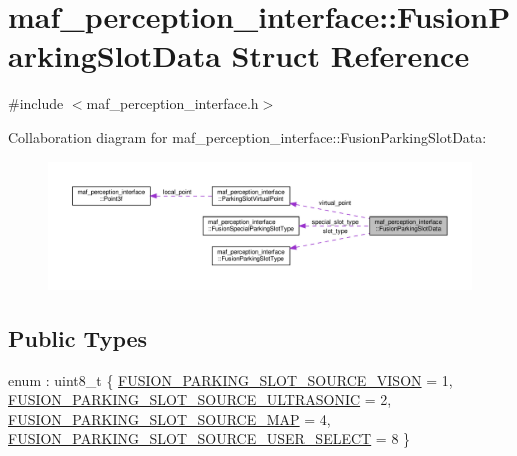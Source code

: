 \hypertarget{structmaf__perception__interface_1_1FusionParkingSlotData}{}\section{maf\+\_\+perception\+\_\+interface\+:\+:Fusion\+Parking\+Slot\+Data Struct Reference}
\label{structmaf__perception__interface_1_1FusionParkingSlotData}


{\ttfamily \#include $<$maf\+\_\+perception\+\_\+interface.\+h$>$}



Collaboration diagram for maf\+\_\+perception\+\_\+interface\+:\+:Fusion\+Parking\+Slot\+Data\+:\nopagebreak
\begin{figure}[H]
\begin{center}
\leavevmode
\includegraphics[width=350pt]{structmaf__perception__interface_1_1FusionParkingSlotData__coll__graph}
\end{center}
\end{figure}
\subsection*{Public Types}
\begin{DoxyCompactItemize}
\item 
enum \+: uint8\+\_\+t \{ \hyperlink{structmaf__perception__interface_1_1FusionParkingSlotData_a31f26bc8eda5baf9ea9398db41a7f304ab13b5a160f0258968905fd159f14f3cd}{F\+U\+S\+I\+O\+N\+\_\+\+P\+A\+R\+K\+I\+N\+G\+\_\+\+S\+L\+O\+T\+\_\+\+S\+O\+U\+R\+C\+E\+\_\+\+V\+I\+S\+ON} = 1, 
\hyperlink{structmaf__perception__interface_1_1FusionParkingSlotData_a31f26bc8eda5baf9ea9398db41a7f304a51fe14fc7e7e142e8147a02eeceaf8b6}{F\+U\+S\+I\+O\+N\+\_\+\+P\+A\+R\+K\+I\+N\+G\+\_\+\+S\+L\+O\+T\+\_\+\+S\+O\+U\+R\+C\+E\+\_\+\+U\+L\+T\+R\+A\+S\+O\+N\+IC} = 2, 
\hyperlink{structmaf__perception__interface_1_1FusionParkingSlotData_a31f26bc8eda5baf9ea9398db41a7f304a6a7bb3902bc0268e1199ce40e0bf4f10}{F\+U\+S\+I\+O\+N\+\_\+\+P\+A\+R\+K\+I\+N\+G\+\_\+\+S\+L\+O\+T\+\_\+\+S\+O\+U\+R\+C\+E\+\_\+\+M\+AP} = 4, 
\hyperlink{structmaf__perception__interface_1_1FusionParkingSlotData_a31f26bc8eda5baf9ea9398db41a7f304a605efc2525c3429556d6cc59d88ce343}{F\+U\+S\+I\+O\+N\+\_\+\+P\+A\+R\+K\+I\+N\+G\+\_\+\+S\+L\+O\+T\+\_\+\+S\+O\+U\+R\+C\+E\+\_\+\+U\+S\+E\+R\+\_\+\+S\+E\+L\+E\+CT} = 8
 \}
\end{DoxyCompactItemize}
